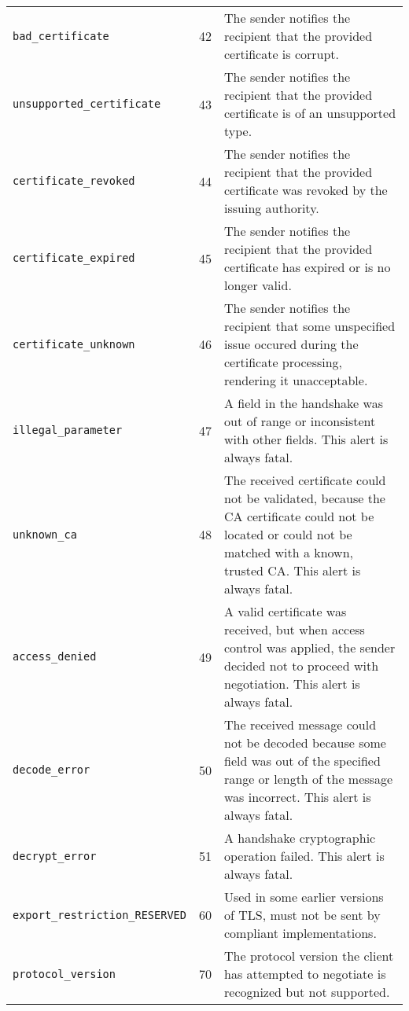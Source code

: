 \begin{tabularx}{\linewidth}{@{}l l X}
    \texttt{bad\_certificate}             & 42  & The sender notifies the recipient that the provided certificate is corrupt. \\
    \texttt{unsupported\_certificate}     & 43  & The sender notifies the recipient that the provided certificate is of an unsupported type. \\
    \texttt{certificate\_revoked}         & 44  & The sender notifies the recipient that the provided certificate was revoked by the issuing authority. \\
    \texttt{certificate\_expired}         & 45  & The sender notifies the recipient that the provided certificate has expired or is no longer valid. \\
    \texttt{certificate\_unknown}         & 46  & The sender notifies the recipient that some unspecified issue occured during the certificate processing,
                                                  rendering it unacceptable. \\
    \texttt{illegal\_parameter}           & 47  & A field in the handshake was out of range or inconsistent with other fields. This alert is always fatal. \\
    \texttt{unknown\_ca}                  & 48  & The received certificate could not be validated, because the CA certificate could not be located or could
                                                  not be matched with a known, trusted CA. This alert is always fatal. \\
    \texttt{access\_denied}               & 49  & A valid certificate was received, but when access control was applied, the sender decided not to proceed
                                                  with negotiation. This alert is always fatal. \\
    \texttt{decode\_error}                & 50  & The received message could not be decoded because some field was out of the specified range or length of
                                                  the message was incorrect. This alert is always fatal. \\
    \texttt{decrypt\_error}               & 51  & A handshake cryptographic operation failed. This alert is always fatal. \\
    \texttt{export\_restriction\_RESERVED}& 60  & Used in some earlier versions of TLS, must not be sent by compliant implementations. \\
    \texttt{protocol\_version}            & 70  & The protocol version the client has attempted to negotiate is recognized but not supported.

\end{tabularx}
